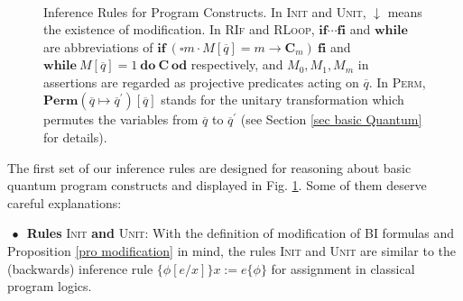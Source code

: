 \documentclass[conference,compsoc, 10pt]{IEEEtran}
\newcommand {\qbar} {{\overline{q}}}
\newcommand{\Mexist}{{\downarrow}}
\newcommand {\prog } {{\mathbf{C}}}
\newcommand {\sepimp} {\mathrel{-\mkern-6mu*}}
\newcommand{\sd}{\diamond}%
\newcommand {\sdimp} {\mathrel{-\mkern-2.5mu\diamond}}
\newcommand {\perm} {\mathbf{Perm}}
\begin{document}
\begin{figure}
\begin{equation*}
\begin{split}
		\end{split}\end{equation*}
		\caption{Inference Rules for Program Constructs. In \textsc{Init} and \textsc{Unit}, $\Mexist$ means the existence of modification. In \textsc{RIf} and \textsc{RLoop}, $\mathbf{if}\cdots\mathbf{fi}$ and $\mathbf{while}$ are abbreviations of $\mathbf{if}\ (\square m\cdot M[\qbar] = m \rightarrow \prog_m )\ \mathbf{fi}$ and $\mathbf{while}\ M[\qbar]=1\ \mathbf{do}\ \prog\ \mathbf{od}$ respectively, and  $M_0,M_1,M_m$ in assertions are regarded as projective predicates acting on $\qbar$. In \textsc{Perm}, $\perm(\qbar\mapsto\qbar^\prime)[\qbar]$ stands for the unitary transformation which permutes the variables from $\qbar$ to $\qbar^\prime$ (see Section \ref{sec basic Quantum} for details).
		}
		\label{fig proof system 1}
	\end{figure}
	
	
	The first set of our inference rules are designed for reasoning about basic quantum program constructs and displayed in Fig. \ref{fig proof system 1}. Some of them deserve careful explanations:
	
	\vspace{0.2cm}
	
    \noindent $\ \bullet\, $ \textbf{Rules} \textsc{Init} \textbf{and} \textsc{Unit}: With
      the definition of modification of BI formulas and Proposition \ref{pro
      modification} in mind, the rules \textsc{Init} and \textsc{Unit} are
      similar to the (backwards) inference rule $\{\phi[e/x]\}x:=e\{\phi\}$ for
      assignment in classical program logics.
		
		
		
		
\end{document}
